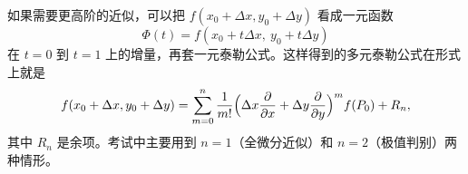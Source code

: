 如果需要更高阶的近似，可以把 \(f(x_0+\Delta x,y_0+\Delta y)\) 看成一元函数
\[
    \Phi(t)=f(x_0+t\Delta x,\ y_0+t\Delta y)
\]
在 \(t=0\) 到 \(t=1\) 上的增量，再套一元泰勒公式。这样得到的多元泰勒公式在形式上就是
\[
    f(x_0+\Delta x,y_0+\Delta y)
    =\sum_{m=0}^{n}\frac1{m!}
    \Bigl(\Delta x\frac{\partial}{\partial x}
    +\Delta y\frac{\partial}{\partial y}\Bigr)^m f(P_0)+R_n,
\]
其中 \(R_n\) 是余项。考试中主要用到 \(n=1\)（全微分近似）和 \(n=2\)（极值判别）两种情形。


